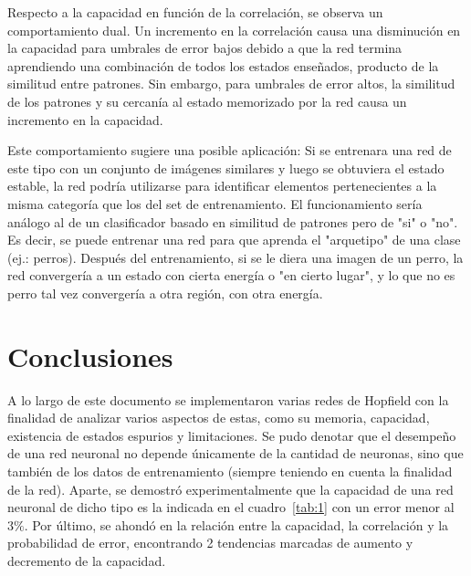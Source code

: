 \documentclass[11pt]{article} %
\begin{document}
Respecto a la capacidad en función de la correlación, se observa un comportamiento dual. Un incremento en la correlación causa una disminución en la capacidad para umbrales de error bajos debido a que la red termina aprendiendo una combinación de todos los estados enseñados, producto de la similitud entre patrones. Sin embargo, para umbrales de error altos, la similitud de los patrones y su cercanía al estado memorizado por la red causa un incremento en la capacidad. 

Este comportamiento sugiere una posible aplicación: Si se entrenara una red de este tipo con un conjunto de imágenes similares y luego se obtuviera el estado estable, la red podría utilizarse para identificar elementos pertenecientes a la misma categoría que los del set de entrenamiento. El funcionamiento sería análogo al de un clasificador basado en similitud de patrones pero de "si" o "no". Es decir, se puede entrenar una red para que aprenda el "arquetipo" de una clase (ej.: perros). Después del entrenamiento, si se le diera una imagen de un perro, la red convergería a un estado con cierta energía o "en cierto lugar", y lo que no es perro tal vez convergería a otra región, con otra energía. 

\section{Conclusiones}

A lo largo de este documento se implementaron varias redes de Hopfield con la finalidad de analizar varios aspectos de estas, como su memoria, capacidad, existencia de estados espurios y limitaciones. Se pudo denotar que el desempeño de una red neuronal no depende únicamente de la cantidad de neuronas, sino que también de los datos de entrenamiento (siempre teniendo en cuenta la finalidad de la red). Aparte, se demostró experimentalmente que la capacidad de una red neuronal de dicho tipo es la indicada en el cuadro~\ref{tab:1} con un error menor al $3\%$. Por último, se ahondó en la relación entre la capacidad, la correlación y la probabilidad de error, encontrando 2 tendencias marcadas de aumento y decremento de la capacidad. 
\end{document}
